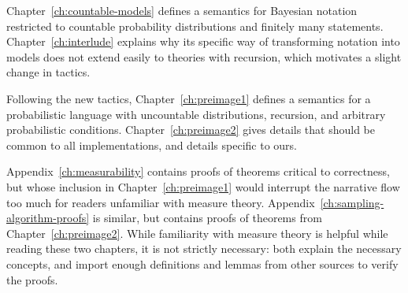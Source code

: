 Chapter~\ref{ch:countable-models} defines a semantics for Bayesian notation restricted to countable probability distributions and finitely many statements.
Chapter~\ref{ch:interlude} explains why its specific way of transforming notation into models does not extend easily to theories with recursion, which motivates a slight change in tactics.

Following the new tactics, Chapter~\ref{ch:preimage1} defines a semantics for a probabilistic language with uncountable distributions, recursion, and arbitrary probabilistic conditions.
Chapter~\ref{ch:preimage2} gives details that should be common to all implementations, and details specific to ours.

Appendix~\ref{ch:measurability} contains proofs of theorems critical to correctness, but whose inclusion in Chapter~\ref{ch:preimage1} would interrupt the narrative flow too much for readers unfamiliar with measure theory.
Appendix~\ref{ch:sampling-algorithm-proofs} is similar, but contains proofs of theorems from Chapter~\ref{ch:preimage2}.
While familiarity with measure theory is helpful while reading these two chapters, it is not strictly necessary: both explain the necessary concepts, and import enough definitions and lemmas from other sources to verify the proofs.
